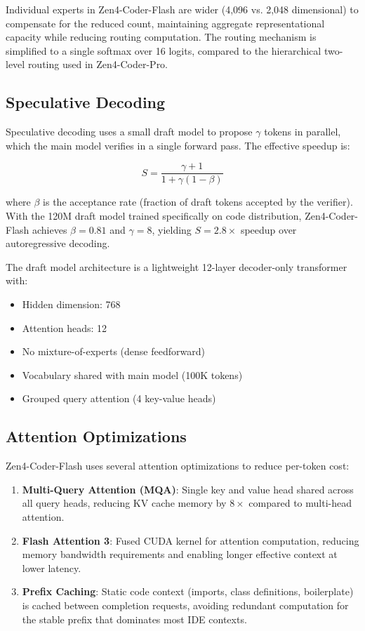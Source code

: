 \documentclass[11pt,a4paper]{article}
\begin{document}
Individual experts in Zen4-Coder-Flash are wider (4,096 vs. 2,048 dimensional) to compensate for the reduced count, maintaining aggregate representational capacity while reducing routing computation. The routing mechanism is simplified to a single softmax over 16 logits, compared to the hierarchical two-level routing used in Zen4-Coder-Pro.

\subsection{Speculative Decoding}

Speculative decoding \cite{speculative} uses a small draft model to propose $\gamma$ tokens in parallel, which the main model verifies in a single forward pass. The effective speedup is:

\begin{equation}
  S = \frac{\gamma + 1}{1 + \gamma(1 - \beta)}
\end{equation}

where $\beta$ is the acceptance rate (fraction of draft tokens accepted by the verifier). With the 120M draft model trained specifically on code distribution, Zen4-Coder-Flash achieves $\beta = 0.81$ and $\gamma = 8$, yielding $S = 2.8\times$ speedup over autoregressive decoding.

The draft model architecture is a lightweight 12-layer decoder-only transformer with:
\begin{itemize}
  \item Hidden dimension: 768
  \item Attention heads: 12
  \item No mixture-of-experts (dense feedforward)
  \item Vocabulary shared with main model (100K tokens)
  \item Grouped query attention (4 key-value heads)
\end{itemize}

\subsection{Attention Optimizations}

Zen4-Coder-Flash uses several attention optimizations to reduce per-token cost:

\begin{enumerate}
  \item \textbf{Multi-Query Attention (MQA)}: Single key and value head shared across all query heads, reducing KV cache memory by $8\times$ compared to multi-head attention.
  \item \textbf{Flash Attention 3}: Fused CUDA kernel for attention computation, reducing memory bandwidth requirements and enabling longer effective context at lower latency.
  \item \textbf{Prefix Caching}: Static code context (imports, class definitions, boilerplate) is cached between completion requests, avoiding redundant computation for the stable prefix that dominates most IDE contexts.
\end{enumerate}
\end{document}
